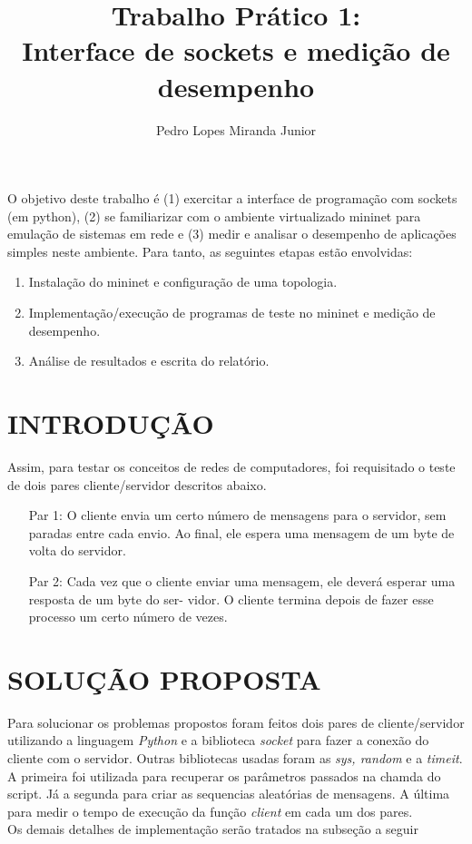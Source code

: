 \documentclass[12pt]{article}
\title{Trabalho Prático 1: \\Interface de sockets e medição de desempenho}
\author{Pedro Lopes Miranda Junior}
\begin{document}
\maketitle

\begin{resumo}
  O objetivo deste trabalho é (1) exercitar a interface de programação com sockets (em python),
  (2) se familiarizar com o ambiente virtualizado mininet para emulação de sistemas em rede e
  (3) medir e analisar o desempenho de aplicações simples neste ambiente.
  Para tanto, as seguintes etapas estão envolvidas:
  \begin{enumerate}
  \item Instalação do mininet e configuração de uma topologia.
  \item Implementação/execução de programas de teste no mininet e medição de desempenho.
  \item Análise de resultados e escrita do relatório.
  \end{enumerate}
\end{resumo}

\section{INTRODUÇÃO}
\label{introducao}

Assim, para testar os conceitos de redes de computadores, foi requisitado o teste de dois pares cliente/servidor
descritos abaixo.
\begin{enumerate}
\item[Par 1:] O cliente envia um certo número de mensagens para o servidor, sem paradas entre cada envio. 
Ao final, ele espera uma mensagem de um byte de volta do servidor.\\
\item[Par 2:] Cada vez que o cliente enviar uma mensagem, ele deverá esperar uma resposta de um byte do ser-
vidor. 
O cliente termina depois de fazer esse processo um certo número de vezes.
\end{enumerate}

\section{SOLUÇÃO PROPOSTA}
\label{solucao_proposta}

Para solucionar os problemas propostos foram feitos dois pares de cliente/servidor utilizando a linguagem \textit{Python}
e a biblioteca \textit{socket} para fazer a conexão do cliente com o servidor.
Outras bibliotecas usadas foram as \textit{sys, random} e a \textit{timeit}.\\
A primeira foi utilizada para recuperar os parâmetros passados na chamda do script. 
Já a segunda para criar as sequencias aleatórias de mensagens. A última 
para medir o tempo de execução da função \textit{client} em cada um dos pares.\\
Os demais detalhes de implementação serão tratados na subseção a seguir
\end{document}
